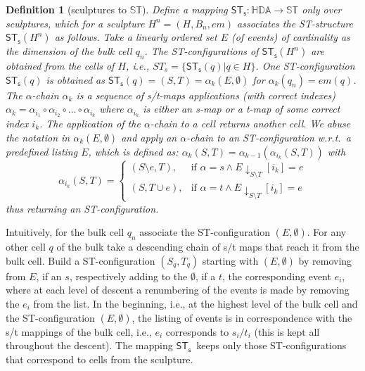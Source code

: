 \documentclass[submission,copyright,creativecommons]{eptcs}
\newtheorem{definition}[theorem]{Definition}
\newcounter{case}
\newcommand\allST{\ensuremath{\mathbb{ST}}}
\newcommand\allHDA{\ensuremath{\mathbb{HDA}}}
\newcommand\sculpintost{\ensuremath{\mathsf{ST}_{\!\mathsf{s}}}}
\newcommand\sculpture[2]{\ensuremath{#1^{#2}}}
\newcommand\alphachain[1]{\ensuremath{\alpha_{#1}}}
\newcommand\embedMorphism{\ensuremath{\mathit{em}}}
\begin{document}
\begin{definition}[sculptures to \allST]\label{def_sculptures_to_ST}
Define a mapping $\sculpintost:\allHDA\rightarrow\allST$ only over sculptures, which for a sculpture $\sculpture{H}{n}=(H,B_{n},\embedMorphism)$ associates the ST-structure $\sculpintost(\sculpture{H}{n})$ as follows.
Take a linearly ordered set $E$ (of events) of cardinality as the dimension of the bulk cell $q_{n}$. The ST-configurations of $\sculpintost(\sculpture{H}{n})$ are obtained from the cells of $H$, i.e., $ST_{s}=\{\sculpintost(q)|q\in H\}$.
One ST-configuration $\sculpintost(q)$ is obtained as $\sculpintost(q)=(S,T)=\alphachain{k}(E,\emptyset)$ for $\alphachain{k}(q_{n})=\embedMorphism(q)$. The \emph{$\alpha$-chain} $\alphachain{k}$ is a sequence of s/t-maps applications (with correct indexes) $\alphachain{k}=\alpha_{i_{1}}\circ\alpha_{i_{2}}\circ\dots\circ\alpha_{i_{k}}$ where $\alpha_{i_{k}}$ is either an s-map or a t-map of some correct index $i_{k}$. The application of the $\alpha$-chain to a cell returns another cell. We abuse the notation in $\alphachain{k}(E,\emptyset)$ and apply an $\alpha$-chain to an ST-configuration w.r.t.\ a predefined listing $E$, which is defined as: $\alphachain{k}(S,T)=\alphachain{k-1}(\alpha_{i_{k}}(S,T))$ with 
\[
\alpha_{i_{k}}(S,T)=\begin{cases} (S\setminus e,T), & \mbox{if } \alpha=s\wedge E\!\!\downarrow_{S\setminus\!T}\!\![i_{k}]=e \\ 
(S,T\cup e), & \mbox{if } \alpha=t\wedge E\!\!\downarrow_{S\setminus\!T}\!\![i_{k}]=e \end{cases}
\]
thus returning an ST-configuration.

\end{definition}

Intuitively, for the bulk cell $q_{n}$ associate the ST-configuration $(E,\emptyset)$. For any other cell $q$ of the bulk take a descending chain of s/t maps that reach it from the bulk cell. Build a ST-configuration $(S_{q},T_{q})$ starting with $(E,\emptyset)$ by removing from $E$, if an $s$, respectively adding to the $\emptyset$, if a $t$, the corresponding event $e_{i}$, where at each level of descent a renumbering of the events is made by removing the $e_{i}$ from the list. In the beginning, i.e., at the highest level of the bulk cell and the ST-configuration $(E,\emptyset)$, the listing of events is in correspondence with the s/t mappings of the bulk cell, i.e., $e_{i}$ corresponds to $s_{i}/t_{i}$ (this is kept all throughout the descent).
The mapping \sculpintost\ keeps only those ST-configurations that correspond to cells from the sculpture.
\end{document}
